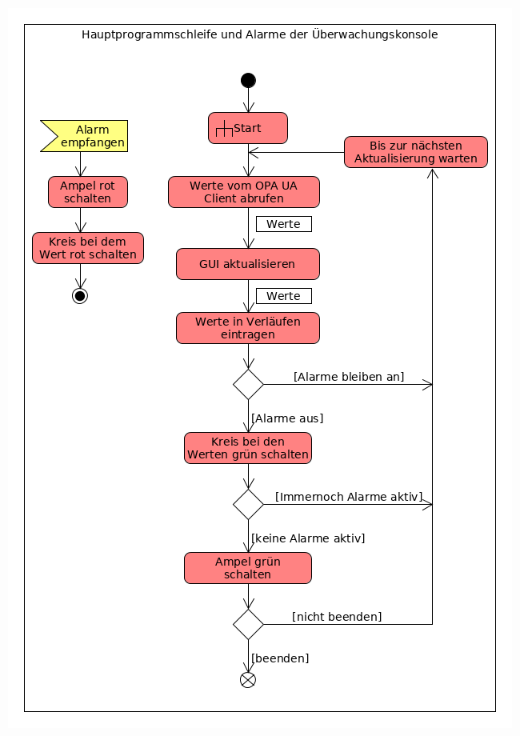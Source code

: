 \documentclass[parskip=full]{scrartcl}
\begin{document}
\begin{center}
  \includegraphics[scale=0.62]{media/Activities/main-console.png}
\end{center}
\end{document}
